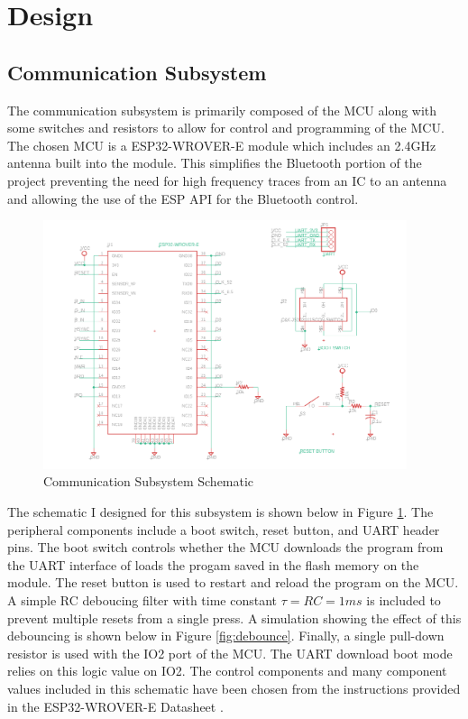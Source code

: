 \documentclass[12pt]{article}
\begin{document}
\section{Design}

\subsection{Communication Subsystem}

The communication subsystem is primarily composed of the MCU along with some switches and resistors to allow for control and programming of the MCU. The chosen MCU is a ESP32-WROVER-E module which includes an 2.4GHz antenna built into the module. This simplifies the Bluetooth portion of the project preventing the need for high frequency traces from an IC to an antenna and allowing the use of the ESP API for the Bluetooth control.

\begin{figure}[!h]
	\centering
	\includegraphics[width=0.95\textwidth]{comms_schem.png}
	\caption{Communication Subsystem Schematic}
	\label{fig:comms_schem}
\end{figure}

The schematic I designed for this subsystem is shown below in Figure \ref{fig:comms_schem}. The peripheral components include a boot switch, reset button, and UART header pins. The boot switch controls whether the MCU downloads the program from the UART interface of loads the progam saved in the flash memory on the module. The reset button is used to restart and reload the program on the MCU. A simple RC deboucing filter with time constant $\tau = RC = 1ms$ is included to prevent multiple resets from a single press. A simulation showing the effect of this debouncing is shown below in Figure \ref{fig:debounce}. Finally, a single pull-down resistor is used with the IO2 port of the MCU. The UART download boot mode relies on this logic value on IO2. The control components and many component values included in this schematic have been chosen from the instructions provided in the ESP32-WROVER-E Datasheet \cite{wrover}.
\end{document}
